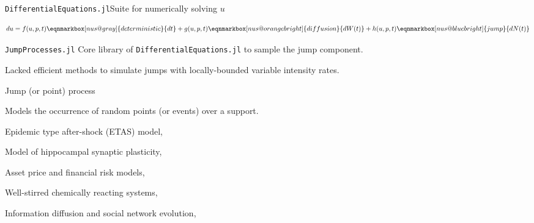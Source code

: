 \documentclass[
  ignorenonframetext,
  aspectratio=169,
  xcolor={dvipsnames,rgb}
]{beamer}
\begin{document}
\begin{frame}{\texttt{DifferentialEquations.jl}}{Suite for numerically solving \( u \)}

\vspace{2em}

{\Large
\[
  du = 
      f(u, p, t) \eqnmarkbox[nus@gray]{deterministic}{dt} 
    + g (u, p, t) \eqnmarkbox[nus@orangebright]{diffusion}{dW (t)} 
    + h (u, p, t) \eqnmarkbox[nus@bluebright]{jump}{dN (t)}
\]
}


\vspace{3em}

\alert{\texttt{JumpProcesses.jl}} Core library of \texttt{DifferentialEquations.jl} to sample the jump component.

Lacked efficient methods to simulate jumps with locally-bounded variable intensity rates.

\end{frame}


\begin{frame}{Jump (or point) process}


Models the occurrence of random points (or events) over a support. 

\vspace{3em}

\begin{description}[labelwidth=2cm]
  \item[Seismology] Epidemic type after-shock (ETAS) model, \eg~\citet{saichev2007}
  \item[Neuroscience] Model of hippocampal synaptic plasticity, \eg~\citet{rodrigues2021}
  \item[Finance] Asset price and financial risk models, \eg~\citet{bjork2021}
  \item[Biochemistry] Well-stirred chemically reacting systems, \eg~\citet{gillespie2001}
  \item[Social Media] Information diffusion and social network evolution, \eg~\citet{farajtabar2017}
\end{description}

\end{frame}
\end{document}
